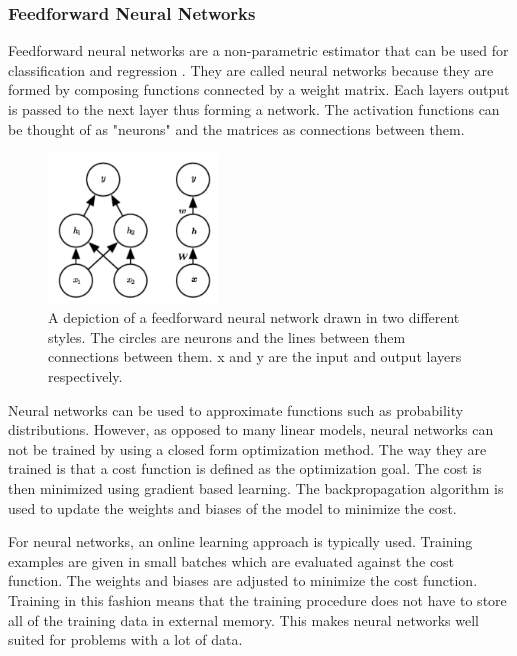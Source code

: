 
\subsubsection{Feedforward Neural Networks}

Feedforward neural networks are a non-parametric estimator that can be used for classification and regression \cite{alpaydin}. They are called neural networks because they are formed by composing functions connected by a weight matrix. Each layers output is passed to the next layer thus forming a network. The activation functions can be thought of as "neurons" and the matrices as connections between them.

\begin{figure}[H]
\centering
\includegraphics[width=0.4\textwidth]{images/nnet.png}
\caption{
  A depiction of a feedforward neural network drawn in two different styles. The circles are neurons and the lines between them connections between them. x and y are the input and output layers respectively. \cite{deep-learning-book}
}
\label{fig:nnet}
\end{figure}

Neural networks can be used to approximate functions such as probability distributions. However, as opposed to many linear models, neural networks can not be trained by using a closed form optimization method. The way they are trained is that a cost function is defined as the optimization goal. The cost is then minimized using gradient based learning. The backpropagation algorithm is used to update the weights and biases of the model to minimize the cost.

For neural networks, an online learning approach is typically used. Training examples are given in small batches which are evaluated against the cost function. The weights and biases are adjusted to minimize the cost function. Training in this fashion means that the training procedure does not have to store all of the training data in external memory. This makes neural networks well suited for problems with a lot of data.

